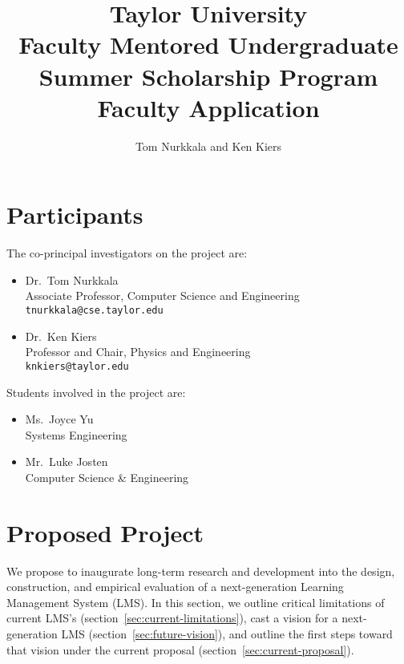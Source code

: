 \documentclass{article}
\title{Taylor University\\
  Faculty Mentored Undergraduate\\
  Summer Scholarship Program\\
  Faculty Application}
\author{Tom Nurkkala and Ken Kiers}
\begin{document}
\maketitle
\tableofcontents

\section{Participants}
\label{sec:participants}

The co-principal investigators on the project are:
\begin{itemize}
\item Dr.\ Tom Nurkkala\\
  Associate Professor, Computer Science and Engineering\\
  \texttt{tnurkkala@cse.taylor.edu}
\item Dr.\ Ken Kiers\\
  Professor and Chair, Physics and Engineering\\
  \texttt{knkiers@taylor.edu}
\end{itemize}
Students involved in the project are:
\begin{itemize}
\item Ms.\ Joyce Yu\\
  Systems Engineering
\item Mr.\ Luke Josten\\
  Computer Science \& Engineering
\end{itemize}


\section{Proposed Project}
\label{sec:proposed-project}


We propose to inaugurate long-term research and development
into the design, construction, and empirical evaluation
of a next-generation Learning Management System (LMS).
In this section, we outline
critical limitations of current LMS's (section~\ref{sec:current-limitations}),
cast a vision for a next-generation LMS (section~\ref{sec:future-vision}),
and outline the first steps toward that vision
under the current proposal (section~\ref{sec:current-proposal}).
\end{document}
